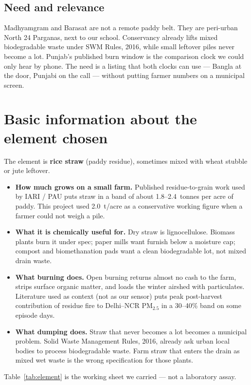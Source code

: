 \documentclass[12pt,a4paper]{article}
\begin{document}
\subsection{Need and relevance}
Madhyamgram and Barasat are not a remote paddy belt. They are peri-urban North 24 Parganas, next to our school. Conservancy already lifts mixed biodegradable waste under SWM Rules, 2016, while small leftover piles never become a lot. Punjab's published burn window is the comparison clock we could only hear by phone. The need is a listing that both clocks can use --- Bangla at the door, Punjabi on the call --- without putting farmer numbers on a municipal screen.

\section{Basic information about the element chosen}
The element is \textbf{rice straw} (paddy residue), sometimes mixed with wheat stubble or jute leftover.

\begin{itemize}
  \item \textbf{How much grows on a small farm.} Published residue-to-grain work used by IARI / PAU puts straw in a band of about 1.8--2.4~tonnes per acre of paddy. This project used 2.0~t/acre as a conservative working figure when a farmer could not weigh a pile.
  \item \textbf{What it is chemically useful for.} Dry straw is lignocellulose. Biomass plants burn it under spec; paper mills want furnish below a moisture cap; compost and biomethanation pads want a clean biodegradable lot, not mixed drain waste.
  \item \textbf{What burning does.} Open burning returns almost no cash to the farm, strips surface organic matter, and loads the winter airshed with particulates. Literature used as context (not as our sensor) puts peak post-harvest contribution of residue fire to Delhi--NCR PM$_{2.5}$ in a 30--40\% band on some episode days.
  \item \textbf{What dumping does.} Straw that never becomes a lot becomes a municipal problem. Solid Waste Management Rules, 2016, already ask urban local bodies to process biodegradable waste. Farm straw that enters the drain as mixed wet waste is the wrong specification for those plants.
\end{itemize}

Table~\ref{tab:element} is the working sheet we carried --- not a laboratory assay.
\end{document}
